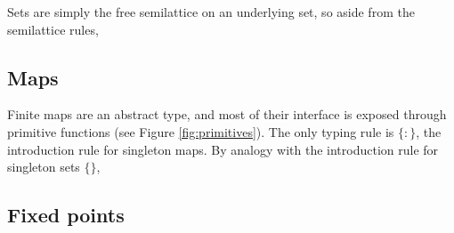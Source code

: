 Sets are simply the free semilattice on an underlying set, so aside from the
semilattice rules,

\subsection{Maps}
Finite maps are an abstract type, and most of their interface is exposed through
primitive functions (see Figure \ref{fig:primitives}). The only typing rule is
$\{:\}$, the introduction rule for singleton maps. By analogy with the
introduction rule for singleton sets $\{\}$,

\subsection{Fixed points}

\newpage
